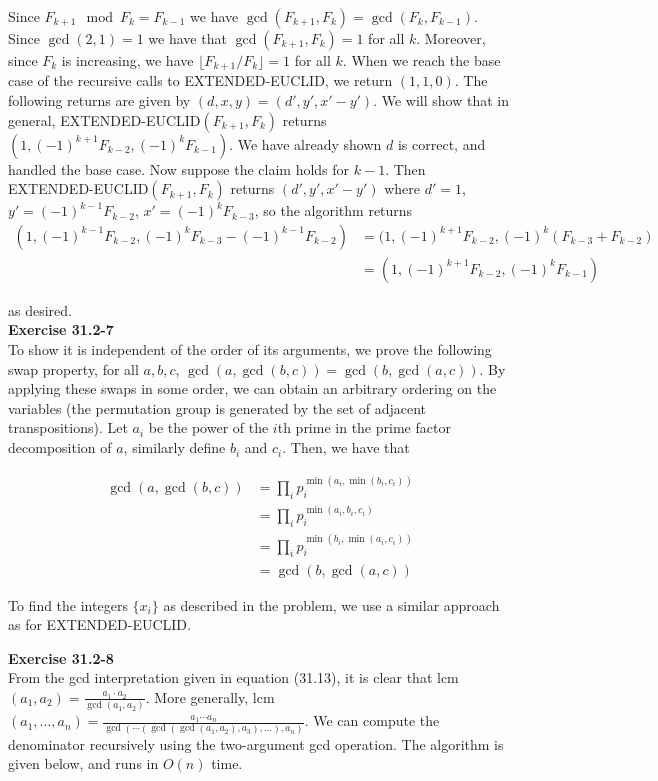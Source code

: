 \documentclass{article}
\begin{document}
Since $F_{k+1} \mod F_{k} = F_{k-1}$ we have $\gcd(F_{k+1},F_k) = \gcd(F_k,F_{k-1})$.  Since $\gcd(2,1) = 1$ we have that $\gcd(F_{k+1},F_k) = 1$ for all $k$.  Moreover, since $F_k$ is increasing, we have $\lfloor F_{k+1} / F_k \rfloor = 1$ for all $k$. When we reach the base case of the recursive calls to EXTENDED-EUCLID, we return $(1,1,0)$. The following returns are given by $(d,x,y) = (d',y',x'-y')$.  We will show that in general, EXTENDED-EUCLID$(F_{k+1},F_k)$ returns $(1, (-1)^{k+1}F_{k-2}, (-1)^kF_{k-1})$. We have already shown $d$ is correct, and handled the base case.  Now suppose the claim holds for $k-1$.  Then EXTENDED-EUCLID$(F_{k+1}, F_{k})$ returns $(d',y',x'-y')$ where $d' = 1$, $y' = (-1)^{k-1}F_{k-2}$, $x' = (-1)^{k}F_{k-3}$, so the algorithm returns 
\begin{align*}
(1,  (-1)^{k-1}F_{k-2}, (-1)^{k}F_{k-3} -  (-1)^{k-1}F_{k-2}) &= (1, (-1)^{k+1} F_{k-2}, (-1)^k(F_{k-3} + F_{k-2}) \\
&=  (1, (-1)^{k+1} F_{k-2}, (-1)^kF_{k-1})
\end{align*}

as desired. \\

\noindent\textbf{Exercise 31.2-7}\\

To show it is independent of the order of its arguments, we prove the following swap property, for all $a,b,c$, $\gcd(a,\gcd(b,c)) = \gcd(b,\gcd(a,c))$. By applying these swaps in some order, we can obtain an arbitrary ordering on the variables (the permutation group is generated by the set of adjacent transpositions). Let $a_i$ be the power of the $i$th prime in the prime factor decomposition of $a$, similarly define $b_i$ and $c_i$. Then, we have that 

\begin{align*}
\gcd(a,\gcd(b,c)) &= \prod_{i}p_i^{\min(a_i,\min(b_i,c_i))}\\
& = \prod_{i}p_i^{\min(a_i,b_i,c_i)} \\
&= \prod_{i}p_i^{\min(b_i,\min(a_i,c_i))} \\
&= \gcd(b,\gcd(a,c)) 
\end{align*}

To find the integers $\{x_i\}$ as described in the problem, we use a similar approach as for EXTENDED-EUCLID. 

\noindent\textbf{Exercise 31.2-8}\\

From the gcd interpretation given in equation (31.13), it is clear that lcm$(a_1, a_2) = \frac{a_1 \cdot a_2}{\gcd(a_1,a_2)}$.  More generally, lcm$(a_1,\ldots,a_n) = \frac{a_1\cdots a_n}{\gcd( \cdots (\gcd(\gcd(a_1,a_2), a_3), \ldots),a_n)}$. We can compute the denominator recursively using the two-argument gcd operation.  The algorithm is given below, and runs in $O(n)$ time. \\
\end{document}
